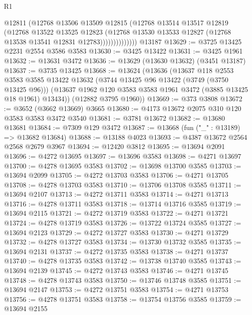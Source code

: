 \begin{lexlean}{R1}
\begin{coremodule}
                      @12811
                      (@12768
                        @13506
                        @13509
                        @12815
                        (@12768
                          @13514
                          @13517
                          @12819
                          (@12768
                            @13522
                            @13525
                            @12823
                            (@12768
                              @13530
                              @13533
                              @12827
                              (@12768 @13538 @13541 @12831 @12783))))))))))))))
    @13187
@13629 := @3725 @13425 @2231 @2554 @3586 @3583
@13630 := @3425 @13422
@13631 := @3425 @1961
@13632 := @13631 @3472
@13636 := @13629 (@13630 @13632) (@3451 @13187)
@13637 := @3735 @13425
@13668 := @13624
    (@13636
      (@13637
        @118
        @2553
        @3583
        @3585
        @13422
        @13632
        (@3744 @13425 @96 @13422 (@3749 (@3750 @13425 @96)))
        (@13637 @1962 @120 @3583 @3583 @1961 @3472 (@3885 @13425 @18 @1961) @13434))
      (@12882 @3795 @1960))
@13669 := @373 @3808
@13672 := @3652 (@3662 @13669) @3665
@13680 := @4173 @13672 @2075 @310 @120 @3583 @3583 @3472 @3540
@13681 := @3781 @13672
@13682 := @13680 @13681
@13684 := @7309 @129 @3472
@13687 := @13668 (fun ("_" : @13189) => @13682 @13684)
@13688 := @13188 @4023
@13693 := @4387 @13672 @2564 @2568 @2679 @3967
@13694 := @12420 @3812
@13695 := @13694 @2091
@13696 := @4272 @13695
@13697 := @13696 @3583
@13698 := @4271 @13697
@13700 := @4278 @13695 @3583
@13702 := @13698 @13700 @3585
@13703 := @13694 @2099
@13705 := @4272 @13703 @3583
@13706 := @4271 @13705
@13708 := @4278 @13703 @3583
@13710 := @13706 @13708 @3585
@13711 := @13694 @2107
@13713 := @4272 @13711 @3583
@13714 := @4271 @13713
@13716 := @4278 @13711 @3583
@13718 := @13714 @13716 @3585
@13719 := @13694 @2115
@13721 := @4272 @13719 @3583
@13722 := @4271 @13721
@13724 := @4278 @13719 @3583
@13726 := @13722 @13724 @3585
@13727 := @13694 @2123
@13729 := @4272 @13727 @3583
@13730 := @4271 @13729
@13732 := @4278 @13727 @3583
@13734 := @13730 @13732 @3585
@13735 := @13694 @2131
@13737 := @4272 @13735 @3583
@13738 := @4271 @13737
@13740 := @4278 @13735 @3583
@13742 := @13738 @13740 @3585
@13743 := @13694 @2139
@13745 := @4272 @13743 @3583
@13746 := @4271 @13745
@13748 := @4278 @13743 @3583
@13750 := @13746 @13748 @3585
@13751 := @13694 @2147
@13753 := @4272 @13751 @3583
@13754 := @4271 @13753
@13756 := @4278 @13751 @3583
@13758 := @13754 @13756 @3585
@13759 := @13694 @2155

\end{coremodule}
\end{lexlean}
